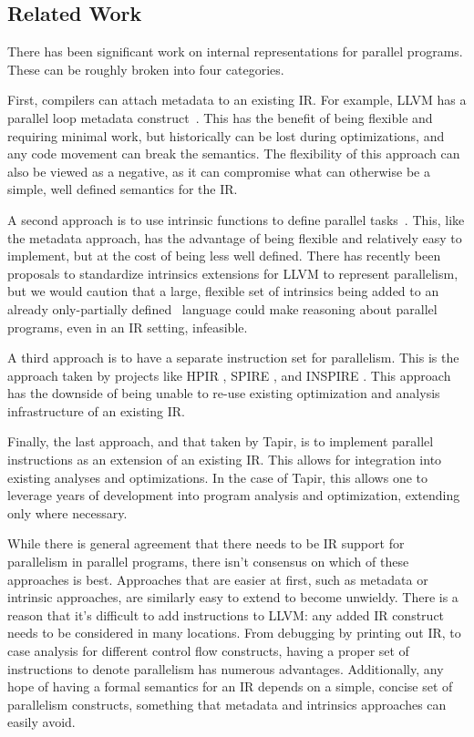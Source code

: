 \documentclass[sigconf]{acmart}
\begin{document}
\subsection{Related Work} \label{Sec:Related}

There has been significant work on internal representations for parallel
programs. These can be roughly broken into four categories. 

First, compilers can attach metadata to an existing IR. For example, LLVM has a
parallel loop metadata construct~\cite{llvmref}. This has the benefit of being
flexible and requiring minimal work, but historically can be lost during
optimizations, and any code movement can break the semantics. The flexibility
of this approach can also be viewed as a negative, as it can compromise
what can otherwise be a simple, well defined semantics for the IR. 

A second approach is to use intrinsic functions to define parallel tasks~\cite{ares}.
This, like the metadata approach, has the advantage of being
flexible and relatively easy to implement, but at the cost of being less well
defined. There has recently been proposals to standardize intrinsics extensions
for LLVM to represent parallelism, but we would caution that a large, flexible
set of intrinsics being added to an already only-partially defined~\cite{verillvm} language could make reasoning about parallel programs, even
in an IR setting, infeasible. 

A third approach is to have a separate instruction set for parallelism. This is
the approach taken by projects like HPIR \cite{zhao2011intermediate}, SPIRE
\cite{khaldi2012spire}, and INSPIRE \cite{jordan2013inspire}. This approach has
the downside of being unable to re-use existing optimization and analysis
infrastructure of an existing IR. 

Finally, the last approach, and that taken by Tapir, is to implement parallel 
instructions as an extension of an existing IR. This allows for integration
into existing analyses and optimizations. In the case of Tapir, this allows one
to leverage years of development into program analysis and optimization,
extending only where necessary. 

While there is general agreement that there needs to be IR support for
parallelism in parallel programs, there isn't consensus on which of these
approaches is best. Approaches that are easier at first, such as metadata
or intrinsic approaches, are similarly easy to extend to become unwieldy. There is
a reason that it's difficult to add instructions to LLVM: any added IR
construct needs to be considered in many locations. From debugging by printing
out IR, to case analysis for different control flow constructs, having 
a proper set of instructions to denote parallelism has numerous advantages. 
Additionally, any hope of having a formal semantics for an IR depends on a 
simple, concise set of parallelism constructs, something that metadata and
intrinsics approaches can easily avoid. 
\end{document}
